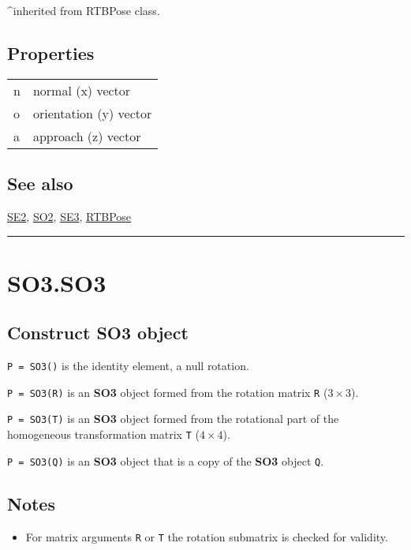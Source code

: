 \textasciicircum  inherited from RTBPose class.


\subsection*{Properties}
\begin{longtable}{lp{120mm}}
n & normal (x) vector\\ 
o & orientation (y) vector\\ 
a & approach (z) vector\\ 
\end{longtable}\vspace{1ex}

\subsection*{See also}


\hyperlink{SE2}{\color{blue} SE2}, \hyperlink{SO2}{\color{blue} SO2}, \hyperlink{SE3}{\color{blue} SE3}, \hyperlink{RTBPose}{\color{blue} RTBPose}

\vspace{1.5ex}\hrule

\hypertarget{SO3.SO3}{\section*{SO3.SO3}}
\subsection*{Construct SO3 object}


\texttt{P = SO3()} is the identity element, a null rotation.



\texttt{P = SO3(R)} is an \textbf{\color{red} SO3} object formed from the rotation
matrix \texttt{R} ($3 \times 3$).



\texttt{P = SO3(T)} is an \textbf{\color{red} SO3} object formed from the rotational part
of the homogeneous transformation matrix \texttt{T} ($4 \times 4$).



\texttt{P = SO3(Q)} is an \textbf{\color{red} SO3} object that is a copy of the \textbf{\color{red} SO3} object \texttt{Q}.


\subsection*{Notes}
\begin{itemize}
  \item For matrix arguments \texttt{R} or \texttt{T} the rotation submatrix is checked for validity.
\end{itemize}

